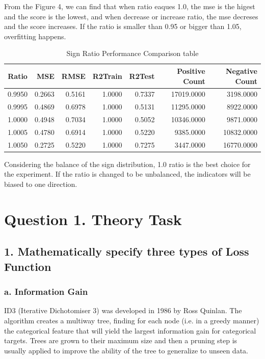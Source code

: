 \documentclass[UTF8]{ctexart}
\begin{document}
From the Figure 4, we can find that when ratio eaques 1.0, the mse is the higest and the score is the lowest, and when decrease or increase ratio, the mse decreses and the score increases. If the ratio is smaller than 0.95 or bigger than 1.05, overfitting happens.

\begin{table}[htbp]
	\centering
	\begin{tabular}{rrrrrrr}
		\toprule
		Ratio  & MSE    & RMSE   & R2Train & R2Test & Positive Count & Negative Count \\
		\midrule
		0.9950 & 0.2663 & 0.5161 & 1.0000  & 0.7337 & 17019.0000     & 3198.0000      \\
		0.9995 & 0.4869 & 0.6978 & 1.0000  & 0.5131 & 11295.0000     & 8922.0000      \\
		1.0000 & 0.4948 & 0.7034 & 1.0000  & 0.5052 & 10346.0000     & 9871.0000      \\
		\cline{1-7}
		1.0005 & 0.4780 & 0.6914 & 1.0000  & 0.5220 & 9385.0000      & 10832.0000     \\
		1.0050 & 0.2725 & 0.5220 & 1.0000  & 0.7275 & 3447.0000      & 16770.0000     \\
		\bottomrule
	\end{tabular}
	\setlength{\abovecaptionskip}{0.3cm}
	\setlength{\belowcaptionskip}{0cm}

	\caption{Sign Ratio Performance Comparison table}
\end{table}

Considering the balance of the sign distribution, 1.0 ratio is the best choice for the experiment. If the ratio is changed to be unbalanced, the indicators will be biased to one direction.

\section*{Question 1. Theory Task}

\subsection*{1. Mathematically specify three types of Loss Function}

\subsubsection*{a. Information Gain}

ID3 (Iterative Dichotomiser 3) was developed in 1986 by Ross Quinlan. The algorithm creates a multiway tree, finding for each node (i.e. in a greedy manner) the categorical feature that will yield the largest information gain for categorical targets. Trees are grown to their maximum size and then a pruning step is usually applied to improve the ability of the tree to generalize to unseen data.
\end{document}
